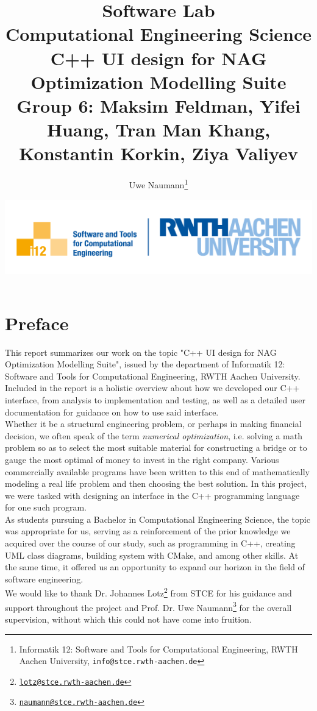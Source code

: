 \documentclass{book}
\title{\bf Software Lab\\ Computational Engineering Science \\
{\large C++ UI design for NAG Optimization Modelling Suite}\\
{\normalsize Group 6: Maksim Feldman, Yifei Huang, Tran Man Khang, Konstantin Korkin, Ziya Valiyev}}
\author{Uwe Naumann\footnote{Informatik 12: Software and Tools for Computational Engineering, RWTH Aachen University, {\tt info@stce.rwth-aachen.de}}}
\date{\includegraphics[width=.6\textwidth]{rwth_i12_softw-werkz_en_rgb}}
\begin{document}

\pagestyle{headings}

\maketitle

\tableofcontents

\chapter*{Preface}
This report summarizes our work on the topic "C++ UI design for NAG Optimization Modelling Suite", issued by the department of Informatik 12: Software and Tools for Computational Engineering, RWTH Aachen University. Included in the report is a holistic overview about how we developed our C++ interface, from analysis to implementation and testing, as well as a detailed user documentation for guidance on how to use said interface. \\
\newline
Whether it be a structural engineering problem, or perhaps in making financial decision, we often speak of the term \textit{numerical optimization}, i.e. solving a math problem so as to select the most suitable material for constructing a bridge or to gauge the most optimal of money to invest in the right company. Various commercially available programs have been written to this end of mathematically modeling a real life problem and then choosing the best solution. In this project, we were tasked with designing an interface in the C++ programming language for one such program.\\
\newline
As students pursuing a Bachelor in Computational Engineering Science, the topic was appropriate for us, serving as a reinforcement of the prior knowledge we acquired over the course of our study, such as programming in C++, creating UML class diagrams, building system with CMake, and among other skills. At the same time, it offered us an opportunity to expand our horizon in the field of software engineering.\\
\newline
We would like to thank Dr. Johannes Lotz\footnote{\tt \href{mailto:lotz@stce.rwth-aachen.de}{\nolinkurl{lotz@stce.rwth-aachen.de}}} from STCE for his guidance and support throughout the project and Prof. Dr. Uwe Naumann\footnote{\tt \href{mailto:naumann@stce.rwth-aachen.de}{\nolinkurl{naumann@stce.rwth-aachen.de}}} for the overall supervision, without which this could not have come into fruition. 
\end{document}
